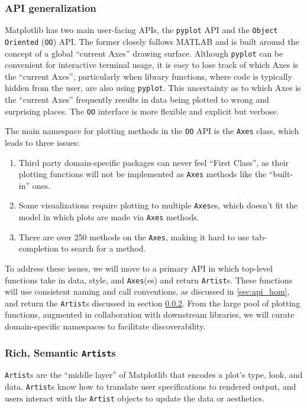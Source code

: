 \documentclass[11pt,letterpaper]{article}  %
\begin{document}
\subsubsection{API generalization}
\label{sec:api_gen}
Matplotlib has two main user-facing APIs, the \texttt{pyplot} API
and the \texttt{Object Oriented} (\texttt{OO})
API.  The former closely follows MATLAB and is built
around the concept of a global ``current Axes'' drawing surface.
Although \texttt{pyplot} can be convenient for interactive terminal
usage, it is easy to lose track of which Axes is the ``current Axes'',
particularly when library functions, where code is typically hidden
from the user, are also using \texttt{pyplot}.
This uncertainty as to which Axes is the ``current Axes'' frequently results in data being
plotted to wrong and surprising places. The \texttt{OO} interface is more flexible and
explicit but verbose.

The main namespace for plotting methods in the \texttt{OO} API is
the \texttt{Axes} class, which leads to three issues:
\begin{enumerate}
\item Third party domain-specific packages can never feel ``First
Class'', as their plotting functions will not be implemented as
\texttt{Axes} methods like the ``built-in'' ones.
\item Some visualizations require plotting to multiple \texttt{Axes}es, which
doesn't fit the model in which plots are made via \texttt{Axes} methods.
\item There are over 250 methods on the \texttt{Axes}, making it hard to use tab-completion to
search for a method.
\end{enumerate}

To address these issues, we will move to a primary API in which
top-level functions take in data, style, and \texttt{Axes}(es) and
return \texttt{Artist}s.  These functions will use consistent naming
and call conventions, as discussed in \ref{sec:api_hom}, and return the
\texttt{Artist}s discussed in section \ref{sec:artists}. From the
large pool of plotting functions, augmented in collaboration with
downstream libraries, we will curate domain-specific namespaces to
facilitate discoverability.


\subsubsection{Rich, Semantic \texttt{Artist}s}
\label{sec:artists}
\texttt{Artist}s are the ``middle layer'' of Matplotlib that encodes a plot's type, look, and data.  \texttt{Artist}s know how to translate user specifications to rendered output, and users interact with the \texttt{Artist} objects to update the data or aesthetics.
\end{document}
